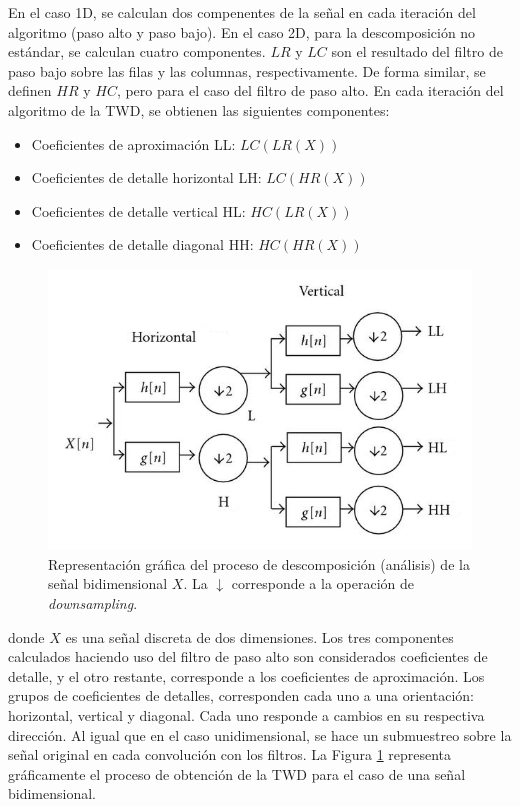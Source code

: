 En el caso 1D, se calculan dos compenentes de la señal en cada iteración del algoritmo (paso alto y
paso bajo). En el caso 2D, para la descomposición no estándar, se calculan cuatro componentes. $LR$ y $LC$ son 
el resultado del filtro de paso bajo
sobre las filas y las columnas, respectivamente. De forma similar, se definen $HR$ y $HC$, pero para el caso
del filtro de paso alto. En cada iteración del algoritmo de la TWD, se obtienen las siguientes componentes:

\begin{itemize}
	\item Coeficientes de aproximación LL: $LC(LR(X))$
	\item Coeficientes de detalle horizontal LH: $LC(HR(X))$
	\item Coeficientes de detalle vertical HL: $HC(LR(X))$ 
	\item Coeficientes de detalle diagonal HH: $HC(HR(X))$
\end{itemize}

\begin{figure}
	\begin{center}
		\includegraphics[scale=2]{Graphics/dwt-2D.png}
		\caption{Representación gráfica del proceso de descomposición (análisis) de la señal bidimensional $X$. La $\downarrow$ corresponde a la operación de \textit{downsampling}.}\label{fig:dwt-2D}
	\end{center}
\end{figure}

\noindent donde $X$ es una señal discreta de dos dimensiones. Los tres componentes calculados haciendo uso del 
filtro de paso alto son considerados coeficientes de detalle, y el otro restante, corresponde a los coeficientes de aproximación. 
Los grupos de coeficientes de
detalles, corresponden cada uno a una orientación: horizontal, vertical y diagonal. Cada uno responde a cambios en su
respectiva dirección. Al igual que en el caso unidimensional, se hace un submuestreo sobre la señal original
en cada convolución con los filtros. La Figura \ref{fig:dwt-2D} representa gráficamente
el proceso de obtención de la TWD para el caso de una señal bidimensional.

